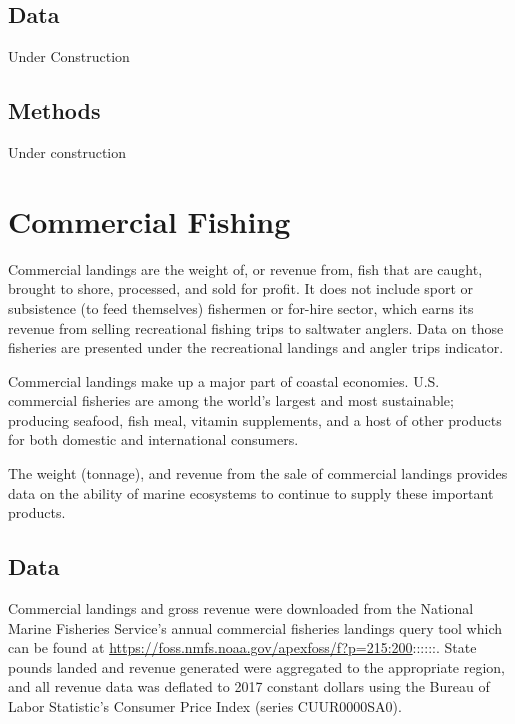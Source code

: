 \documentclass[
]{book}
\begin{document}
\hypertarget{data-13}{%
\section{Data}\label{data-13}}

Under Construction

\hypertarget{methods-13}{%
\section{Methods}\label{methods-13}}

Under construction

\hypertarget{commercial-fishing}{%
\chapter{Commercial Fishing}\label{commercial-fishing}}

Commercial landings are the weight of, or revenue from, fish that are caught, brought to shore, processed, and sold for profit. It does not include sport or subsistence (to feed themselves) fishermen or for-hire sector, which earns its revenue from selling recreational fishing trips to saltwater anglers. Data on those fisheries are presented under the recreational landings and angler trips indicator.

Commercial landings make up a major part of coastal economies. U.S. commercial fisheries are among the world's largest and most sustainable; producing seafood, fish meal, vitamin supplements, and a host of other products for both domestic and international consumers.

The weight (tonnage), and revenue from the sale of commercial landings provides data on the ability of marine ecosystems to continue to supply these important products.

\hypertarget{data-14}{%
\section{Data}\label{data-14}}

Commercial landings and gross revenue were downloaded from the National Marine Fisheries Service's annual commercial fisheries landings query tool which can be found at \url{https://foss.nmfs.noaa.gov/apexfoss/f?p=215:200}::::::. State pounds landed and revenue generated were aggregated to the appropriate region, and all revenue data was deflated to 2017 constant dollars using the Bureau of Labor Statistic's Consumer Price Index (series CUUR0000SA0).
\end{document}
